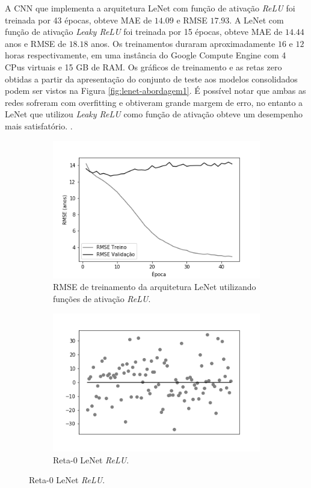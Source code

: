 A CNN que implementa a arquitetura LeNet com função de ativação \emph{ReLU} foi treinada por 43 épocas, obteve MAE de $14.09$ e RMSE $17.93$. A LeNet com função de ativação \emph{Leaky ReLU} foi treinada por 15 épocas, obteve MAE de $14.44$ anos e RMSE de $18.18$ anos. Os treinamentos duraram aproximadamente $16$ e $12$ horas respectivamente, em uma instância do Google Compute Engine com 4 CPus virtuais e 15 GB de RAM. Os gráficos de treinamento e as retas zero obtidas a partir da apresentação do conjunto de teste aos modelos consolidados podem ser vistos na Figura \ref{fig:lenet-abordagem1}. É possível notar que ambas as redes sofreram com overfitting e obtiveram grande margem de erro, no entanto a LeNet que utilizou \emph{Leaky ReLU} como função de ativação obteve um desempenho mais satisfatório.
.
\begin{figure}[hb!]
	\caption{Resultados do treinamento e teste da CNN LeNet.}\label{fig:lenet-abordagem1}
  \begin{subfigure}[hb]{0.5\linewidth}
    \caption{RMSE de treinamento da arquitetura LeNet utilizando funções de ativação \emph{ReLU}.}
    \label{fig:redeneuralbiologica}
    \includegraphics[width=\linewidth]{img/graficos-fase2/fig-history-lenet-relu-data-augmentation-2-1.png}%
  \end{subfigure}%
	\begin{subfigure}[hb]{0.5\linewidth}
		\caption{Reta-0 LeNet \emph{ReLU}.}
		\label{fig:redeneuralbiologica}
		\includegraphics[width=\linewidth]{img/graficos-fase2/fig-reta-0-lenetregressor-relu-data-augmentation-2-1.png}%

\end{subfigure}
\end{figure}
